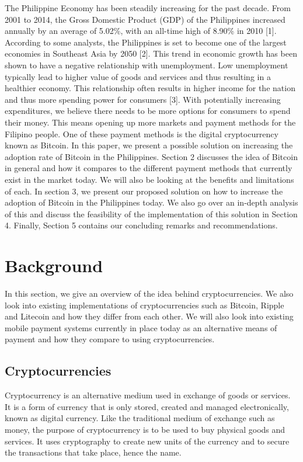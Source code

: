 \documentclass{acm_proc_article-sp}
\begin{document}
The Philippine Economy has been steadily increasing for the past decade. From 2001 to 2014, the Gross Domestic Product (GDP) of the Philippines increased annually by an average of 5.02\%, with an all-time high of 8.90\% in 2010 [1]. According to some analysts, the Philippines is set to become one of the largest economies in Southeast Asia by 2050 [2]. This trend in economic growth has been shown to have a negative relationship with unemployment. Low unemployment typically lead to higher value of goods and services and thus resulting in a healthier economy. This relationship often results in higher income for the nation and thus more spending power for consumers [3]. With potentially increasing expenditures, we believe there needs to be more options for consumers to spend their money. This means opening up more markets and payment methods for the Filipino people. One of these payment methods is the digital cryptocurrency known as Bitcoin.
In this paper, we present a possible solution on increasing the adoption rate of Bitcoin in the Philippines. Section 2 discusses the idea of Bitcoin in general and how it compares to the different payment methods that currently exist in the market today. We will also be looking at the benefits and limitations of each. In section 3, we present our proposed solution on how to increase the adoption of Bitcoin in the Philippines today. We also go over an in-depth analysis of this and discuss the feasibility of the implementation of this solution in Section 4. Finally, Section 5 contains our concluding remarks and recommendations.


\section{Background}

In this section, we give an overview of the idea behind cryptocurrencies. We also look into existing implementations of cryptocurrencies such as Bitcoin, Ripple and Litecoin and how they differ from each other. We will also look into existing mobile payment systems currently in place today as an alternative means of payment and how they compare to using cryptocurrencies.

\subsection{Cryptocurrencies}
Cryptocurrency is an alternative medium used in exchange of goods or services. It is a form of currency that is only stored, created and managed electronically, known as digital currency. Like the traditional medium of exchange such as money, the purpose of cryptocurrency is to be used to buy physical goods and services. It uses cryptography to create new units of the currency and to secure the transactions that take place, hence the name.
\end{document}

